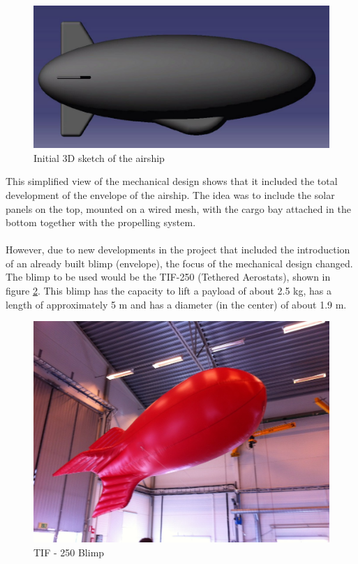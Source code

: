 \pagebreak

\begin{figure}[bht]
\centering
\includegraphics[scale=0.5]{figures/init.png}
\caption{Initial 3D sketch of the airship}
\label{fig:init}
\end{figure}

\noindent
This simplified view of the mechanical design shows that it included the total development of the envelope of the airship. The idea was to include the solar panels on the top, mounted on a wired mesh, with the cargo bay attached in the bottom together with the propelling system.
\\
\\
However, due to new developments in the project that included the introduction of an already built blimp (envelope), the focus of the mechanical design changed. The blimp to be used would be the TIF-250 (Tethered Aerostats), shown in figure \ref{fig:blimp}. This blimp has the capacity to lift a payload of about 2.5 kg, has a length of approximately 5 m and has a diameter (in the center) of about 1.9 m.

\vspace{1.0em}

\begin{figure}[bht]
\centering
\includegraphics[width=\textwidth]{figures/blimp.jpg}
\caption{TIF - 250 Blimp}
\label{fig:blimp}
\end{figure}

